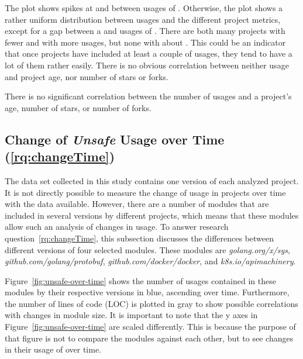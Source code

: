 

The plot shows spikes at  and between  usages of \unsafe{}.
Otherwise, the plot shows a rather uniform distribution between \unsafe{} usages and the different project metrics,
except for a gap between a  and  usages of \unsafe{}.
There are both many projects with fewer and with more usages, but none with about .
This could be an indicator that once projects have included at least a couple of \unsafe{} usages, they tend to have
a lot of them rather easily.
There is no obvious correlation between neither \unsafe{} usage and project age, nor number of stars or forks.

\begin{answerToRQ}[\ref{rq:popularity}]
    There is no significant correlation between the number of \unsafe{} usages and a project's age, number of stars, or
    number of forks.
\end{answerToRQ}



\subsection{Change of \textit{Unsafe} Usage over Time (\ref{rq:changeTime})}\label{subsec:go-geiger:evaluation:over-time}

The data set collected in this study contains one version of each analyzed project.
It is not directly possible to measure the change of \unsafe{} usage in projects over time with the data available.
However, there are a number of modules that are included in several versions by different projects, which means that
these modules allow such an analysis of changes in \unsafe{} usage.
To answer research question~\ref{rq:changeTime}, this subsection discusses the differences between different versions of
four selected modules.
These modules are \textit{golang.org/x/sys}, \textit{github.com/golang/protobuf}, \textit{github.com/docker/docker}, and
\textit{k8s.io/apimachinery}.



Figure~\ref{fig:unsafe-over-time} shows the number of \unsafe{} usages contained in these modules by their respective
versions in blue, ascending over time.
Furthermore, the number of lines of code (\acrshort{LOC}) is plotted in gray to show possible correlations with changes
in module size.
It is important to note that the y axes in Figure~\ref{fig:unsafe-over-time} are scaled differently.
This is because the purpose of that figure is not to compare the modules against each other, but to see changes in their
usage of \unsafe{} over time.

